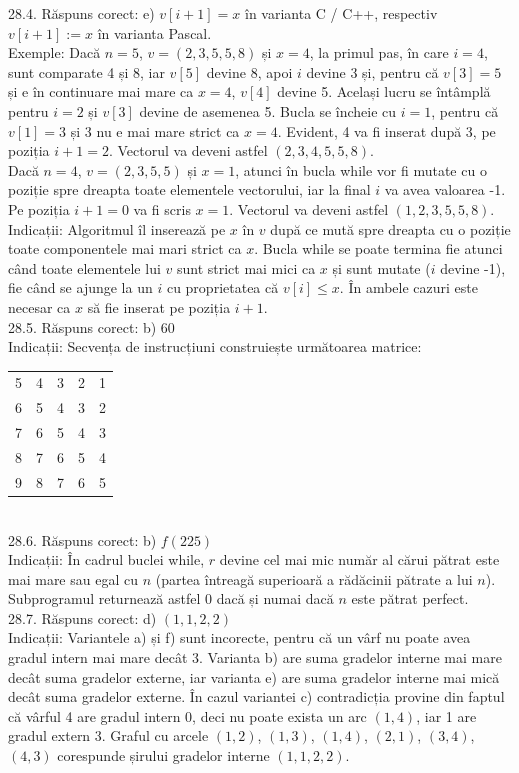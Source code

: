 28.4. Răspuns corect: e) $v[i+1]=x$ în varianta C / C++, respectiv $v[i+1]:=x$ în varianta Pascal.\\
Exemple: Dacă $n=5$, $v=(2,3,5,5,8)$ și $x=4$, la primul pas, în care $i=4$, sunt comparate 4 și 8, iar $v[5]$ devine 8, apoi $i$ devine 3 și, pentru că $v[3]=5$ și e în continuare mai mare ca $x=4$, $v[4]$ devine 5. Același lucru se întâmplă pentru $i=2$ și $v[3]$ devine de asemenea 5. Bucla se încheie cu $i=1$, pentru că $v[1]=3$ și 3 nu e mai mare strict ca $x=4$. Evident, 4 va fi inserat după 3, pe poziția $i+1=2$. Vectorul va deveni astfel $(2,3,4,5,5,8)$.\\ Dacă $n=4$, $v=(2,3,5,5)$ și $x=1$, atunci în bucla while vor fi mutate cu o poziție spre dreapta toate elementele vectorului, iar la final $i$ va avea valoarea -1. Pe poziția $i+1=0$ va fi scris $x=1$. Vectorul va deveni astfel $(1,2,3,5,5,8)$.\\ Indicații: Algoritmul îl inserează pe $x$ în $v$ după ce mută spre dreapta cu o poziție toate componentele mai mari strict ca $x$. Bucla while se poate termina fie atunci când toate elementele lui $v$ sunt strict mai mici ca $x$ și sunt mutate ($i$ devine -1), fie când se ajunge la un $i$ cu proprietatea că $v[i] \leq x$. În ambele cazuri este necesar ca $x$ să fie inserat pe poziția $i+1$.\\

28.5. Răspuns corect: b) 60\\
Indicații: Secvența de instrucțiuni construiește următoarea matrice:\\ \begin{tabular}{lllll} 5 & 4 & 3 & 2 & 1 \\ 6 & 5 & 4 & 3 & 2 \\ 7 & 6 & 5 & 4 & 3 \\ 8 & 7 & 6 & 5 & 4 \\ 9 & 8 & 7 & 6 & 5 \end{tabular}\\

28.6. Răspuns corect: b) $f(225)$\\
Indicații: În cadrul buclei while, $r$ devine cel mai mic număr al cărui pătrat este mai mare sau egal cu $n$ (partea întreagă superioară a rădăcinii pătrate a lui $n$). Subprogramul returnează astfel 0 dacă și numai dacă $n$ este pătrat perfect.\\

28.7. Răspuns corect: d) $(1,1,2,2)$\\
Indicații: Variantele a) și f) sunt incorecte, pentru că un vârf nu poate avea gradul intern mai mare decât 3. Varianta b) are suma gradelor interne mai mare decât suma gradelor externe, iar varianta e) are suma gradelor interne mai mică decât suma gradelor externe. În cazul variantei c) contradicția provine din faptul că vârful 4 are gradul intern 0, deci nu poate exista un arc $(1,4)$, iar 1 are gradul extern 3. Graful cu arcele $(1,2)$, $(1,3)$, $(1,4)$, $(2,1)$, $(3,4)$, $(4,3)$ corespunde șirului gradelor interne $(1,1,2,2)$.\\

